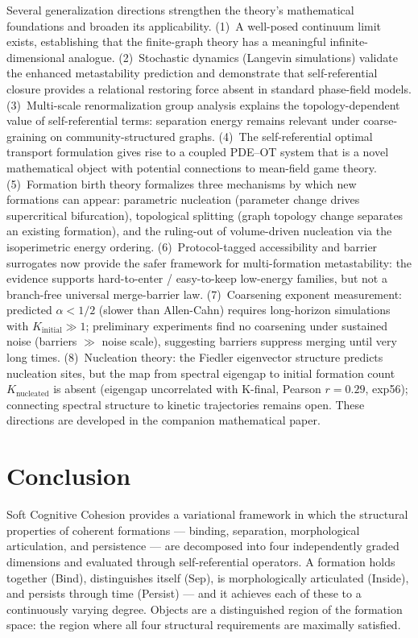 \documentclass[lettersize,journal]{IEEEtran}
\begin{document}
Several generalization directions strengthen the theory's mathematical foundations and broaden its applicability. (1)~A well-posed continuum limit exists, establishing that the finite-graph theory has a meaningful infinite-dimensional analogue. (2)~Stochastic dynamics (Langevin simulations) validate the enhanced metastability prediction and demonstrate that self-referential closure provides a relational restoring force absent in standard phase-field models. (3)~Multi-scale renormalization group analysis explains the topology-dependent value of self-referential terms: separation energy remains relevant under coarse-graining on community-structured graphs. (4)~The self-referential optimal transport formulation gives rise to a coupled PDE--OT system that is a novel mathematical object with potential connections to mean-field game theory. (5)~Formation birth theory formalizes three mechanisms by which new formations can appear: parametric nucleation (parameter change drives supercritical bifurcation), topological splitting (graph topology change separates an existing formation), and the ruling-out of volume-driven nucleation via the isoperimetric energy ordering. (6)~Protocol-tagged accessibility and barrier surrogates now provide the safer framework for multi-formation metastability: the evidence supports hard-to-enter / easy-to-keep low-energy families, but not a branch-free universal merge-barrier law. (7)~Coarsening exponent measurement: predicted $\alpha < 1/2$ (slower than Allen-Cahn) requires long-horizon simulations with $K_{\mathrm{initial}} \gg 1$; preliminary experiments find no coarsening under sustained noise (barriers $\gg$ noise scale), suggesting barriers suppress merging until very long times. (8)~Nucleation theory: the Fiedler eigenvector structure predicts nucleation sites, but the map from spectral eigengap to initial formation count $K_{\mathrm{nucleated}}$ is absent (eigengap uncorrelated with K-final, Pearson $r = 0.29$, exp56); connecting spectral structure to kinetic trajectories remains open. These directions are developed in the companion mathematical paper.

\section{Conclusion}

Soft Cognitive Cohesion provides a variational framework in which the structural properties of coherent formations --- binding, separation, morphological articulation, and persistence --- are decomposed into four independently graded dimensions and evaluated through self-referential operators. A formation holds together (Bind), distinguishes itself (Sep), is morphologically articulated (Inside), and persists through time (Persist) --- and it achieves each of these to a continuously varying degree. Objects are a distinguished region of the formation space: the region where all four structural requirements are maximally satisfied.
\end{document}
